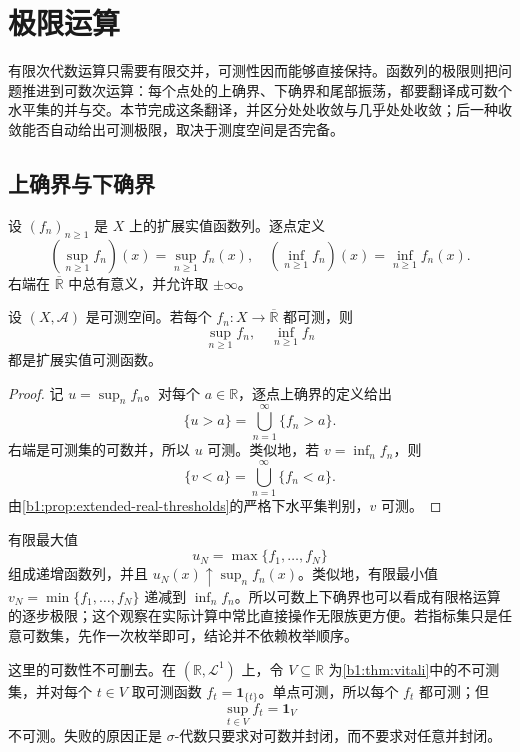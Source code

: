 \section{极限运算}
\label{b1:sec:0402}

有限次代数运算只需要有限交并，可测性因而能够直接保持。函数列的极限则把问题推进到可数次运算：每个点处的上确界、下确界和尾部振荡，都要翻译成可数个水平集的并与交。本节完成这条翻译，并区分处处收敛与几乎处处收敛；后一种收敛能否自动给出可测极限，取决于测度空间是否完备。

\subsection{上确界与下确界}
\label{b1:subsec:040201}

设 \((f_n)_{n\geq1}\) 是 \(X\) 上的扩展实值函数列。逐点定义
\[
\left(\sup_{n\geq1}f_n\right)(x)
=\sup_{n\geq1}f_n(x),
\quad
\left(\inf_{n\geq1}f_n\right)(x)
=\inf_{n\geq1}f_n(x).
\]
右端在 \(\overline{\mathbb R}\) 中总有意义，并允许取 \(\pm\infty\)。

\begin{theorem}
\label{b1:thm:countable-sup-inf-measurable}
设 \((X,\mathcal A)\) 是可测空间。若每个 \(f_n:X\rightarrow\overline{\mathbb R}\) 都可测，则
\[
\sup_{n\geq1}f_n,
\quad
\inf_{n\geq1}f_n
\]
都是扩展实值可测函数。
\end{theorem}
\begin{proof}
记 \(u=\sup_nf_n\)。对每个 \(a\in\mathbb R\)，逐点上确界的定义给出
\[
\{u>a\}=\bigcup_{n=1}^{\infty}\{f_n>a\}.
\]
右端是可测集的可数并，所以 \(u\) 可测。类似地，若 \(v=\inf_nf_n\)，则
\[
\{v<a\}=\bigcup_{n=1}^{\infty}\{f_n<a\}.
\]
由\cref{b1:prop:extended-real-thresholds}的严格下水平集判别，\(v\) 可测。
\end{proof}

有限最大值
\[
u_N=\max\{f_1,\ldots,f_N\}
\]
组成递增函数列，并且 \(u_N(x)\uparrow\sup_nf_n(x)\)。类似地，有限最小值
\(v_N=\min\{f_1,\ldots,f_N\}\) 递减到 \(\inf_nf_n\)。所以可数上下确界也可以看成有限格运算的逐步极限；这个观察在实际计算中常比直接操作无限族更方便。若指标集只是任意可数集，先作一次枚举即可，结论并不依赖枚举顺序。

\ProseParagraphBreak

这里的可数性不可删去。在 \((\mathbb R,\mathcal L^1)\) 上，令 \(V\subseteq\mathbb R\) 为\cref{b1:thm:vitali}中的不可测集，并对每个 \(t\in V\) 取可测函数 \(f_t=\mathbf 1_{\{t\}}\)。单点可测，所以每个 \(f_t\) 都可测；但
\[
\sup_{t\in V}f_t=\mathbf 1_V
\]
不可测。失败的原因正是 \(\sigma\)-代数只要求对可数并封闭，而不要求对任意并封闭。

